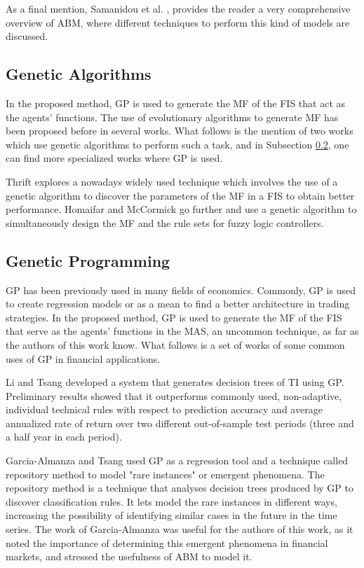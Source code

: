 \documentclass[12pt,journal,compsoc]{IEEEtran}
\begin{document}
As a final mention, Samanidou et al. \cite{Samanidou_2007}, provides the reader a very comprehensive overview of ABM, where different techniques to perform this kind of models are discussed.

\subsection{Genetic Algorithms}
\label{genetic-algorithms}

In the proposed method, GP is used to generate the MF of the FIS that act as the agents' functions. The use of evolutionary algorithms to generate MF has been proposed before in several works. What follows is the mention of two works which use genetic algorithms to perform such a task, and in Subsection \ref{genetic-programming}, one can find more specialized works where GP is used.

Thrift \cite{Thrift1991} explores a nowadays widely used technique which involves the use of a genetic algorithm to discover the parameters of the MF in a FIS to obtain better performance. Homaifar and McCormick \cite{Homaifar1995} go further and use a genetic algorithm to simultaneously design the MF and the rule sets for fuzzy logic controllers.

\subsection{Genetic Programming}
\label{genetic-programming}

GP has been previously used in many fields of economics. Commonly, GP is used to create regression models or as a mean to find a better architecture in trading strategies. In the proposed method, GP is used to generate the MF of the FIS that serve as the agents' functions in the MAS, an uncommon technique, as far as the authors of this work know. What follows is a set of works of some common uses of GP in financial applications.

Li and Tsang \cite{Li1999} developed a system that generates decision trees of TI using GP. Preliminary results showed that it outperforms commonly used, non-adaptive, individual technical rules with respect to prediction accuracy and average annualized rate of return over two different out-of-sample test periods (three and a half year in each period).

Garcia-Almanza and Tsang \cite{Garcia-Almanza2006} used GP as a regression tool and a technique called repository method to model "rare instances" or emergent phenomena. The repository method is a technique that analyses decision trees produced by GP to discover classification rules. It lets model the rare instances in different ways, increasing the possibility of identifying similar cases in the future in the time series. The work of Garcia-Almanza was useful for the authors of this work, as it noted the importance of determining this emergent phenomena in financial markets, and stressed the usefulness of ABM to model it.
\end{document}
